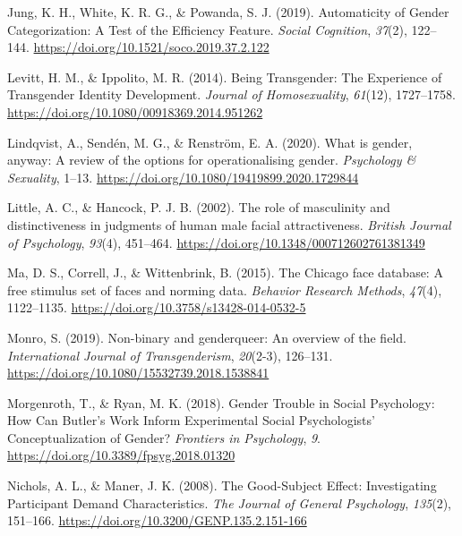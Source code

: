\documentclass[
  man,
  longtable,
  nolmodern,
  notxfonts,
  notimes,
  colorlinks=true,linkcolor=blue,citecolor=blue,urlcolor=blue]{apa7}
\newlength{\cslhangindent}
\newenvironment{CSLReferences}[2] %
 {\begin{list}{}{%
  \setlength{\itemindent}{0pt}
  \setlength{\leftmargin}{0pt}
  \setlength{\parsep}{0pt}
  \ifodd #1
   \setlength{\leftmargin}{\cslhangindent}
   \setlength{\itemindent}{-1\cslhangindent}
  \fi
  \setlength{\itemsep}{#2\baselineskip}}}
 {\end{list}}
\begin{document}
\begin{CSLReferences}{1}{0}
Jung, K. H., White, K. R. G., \& Powanda, S. J. (2019). Automaticity of
{Gender Categorization}: {A Test} of the {Efficiency Feature}.
\emph{Social Cognition}, \emph{37}(2), 122--144.
\url{https://doi.org/10.1521/soco.2019.37.2.122}

Levitt, H. M., \& Ippolito, M. R. (2014). Being {Transgender}: {The
Experience} of {Transgender Identity Development}. \emph{Journal of
Homosexuality}, \emph{61}(12), 1727--1758.
\url{https://doi.org/10.1080/00918369.2014.951262}

Lindqvist, A., Sendén, M. G., \& Renström, E. A. (2020). What is gender,
anyway: A review of the options for operationalising gender.
\emph{Psychology \& Sexuality}, 1--13.
\url{https://doi.org/10.1080/19419899.2020.1729844}

Little, A. C., \& Hancock, P. J. B. (2002). The role of masculinity and
distinctiveness in judgments of human male facial attractiveness.
\emph{British Journal of Psychology}, \emph{93}(4), 451--464.
\url{https://doi.org/10.1348/000712602761381349}

Ma, D. S., Correll, J., \& Wittenbrink, B. (2015). The {Chicago} face
database: {A} free stimulus set of faces and norming data.
\emph{Behavior Research Methods}, \emph{47}(4), 1122--1135.
\url{https://doi.org/10.3758/s13428-014-0532-5}

Monro, S. (2019). Non-binary and genderqueer: {An} overview of the
field. \emph{International Journal of Transgenderism}, \emph{20}(2-3),
126--131. \url{https://doi.org/10.1080/15532739.2018.1538841}

Morgenroth, T., \& Ryan, M. K. (2018). Gender {Trouble} in {Social
Psychology}: {How Can Butler}'s {Work Inform Experimental Social
Psychologists}' {Conceptualization} of {Gender}? \emph{Frontiers in
Psychology}, \emph{9}. \url{https://doi.org/10.3389/fpsyg.2018.01320}

Nichols, A. L., \& Maner, J. K. (2008). The {Good-Subject Effect}:
{Investigating Participant Demand Characteristics}. \emph{The Journal of
General Psychology}, \emph{135}(2), 151--166.
\url{https://doi.org/10.3200/GENP.135.2.151-166}


\end{CSLReferences}
\end{document}
